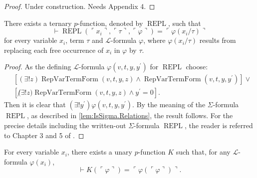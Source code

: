 \begin{proof}
    Under construction. Needs Appendix 4.
\end{proof}

\begin{lemma}
    \label{lem:Code.exists_repl}
    There exists a ternary $p$-function, denoted by $\operatorname{REPL}$, such that
    $$
    \vdash \operatorname{REPL}(\ulcorner{x_i}\urcorner, \ulcorner{\tau}\urcorner, 
    \ulcorner{\varphi}\urcorner) = \ulcorner{\varphi(x_i/\tau)}\urcorner
    $$
    for every variable $x_i$, term $\tau$ and $\mathcal{L}$-formula $\varphi$, where
    $\varphi(x_i/\tau)$ results from replacing each free occurrence of $x_i$ in $\varphi$ by $\tau$.
\end{lemma}

\begin{proof}
    As the defining $\mathcal{L}$-formula $\varphi(v,t,y,y^\prime)$ for $\operatorname{REPL}$ 
    choose:
    \begin{equation*}
        \begin{split}
    & [(\exists!z)\operatorname{RepVarTermForm}(v,t,y,z) \land 
    \operatorname{RepVarTermForm}(v,t,y,y^\prime)] \lor \\
    & [\not (\exists!z)\operatorname{RepVarTermForm}(v,t,y,z) \land y^\prime = 0].
        \end{split}
    \end{equation*}
    Then it is clear that $(\exists!y^\prime)\varphi(v,t,y,y^\prime)$.
    By the meaning of the $\Sigma$-formula $\operatorname{REPL}$, as described in
    \ref{lem:IsSigma.Relations}, the result follows.
    For the precise details including the written-out $\Sigma$-formula $\operatorname{REPL}$,
    the reader is referred to Chapter 3 and 5 of \cite{swierczkowski2003finite}.
\end{proof}

\begin{lemma}
    \label{lem:Code.exists_pFunc_forall_form_eq_code_form}
    \leanok
    For every variable $x_i$, there exists a unary $p$-function $K$ such that, 
    for any $\mathcal{L}$-formula $\varphi(x_i)$,
    $$
    \vdash K (\ulcorner{\varphi}\urcorner) = 
    \ulcorner{\varphi(\ulcorner {\varphi} \urcorner)}\urcorner.
    $$
\end{lemma}

